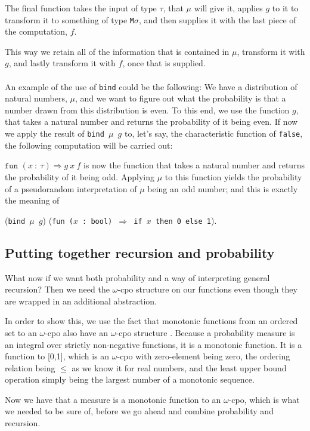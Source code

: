 \documentclass[11pt, leqno, titlepage]{article}
\theoremstyle{definition}
\begin{document}
The final function takes the input of type $\tau$, that $\mu$ will give it,
applies $g$ to it to transform it to something of type \texttt{M}$\sigma$, and then
supplies it with the last piece of the computation, $f$.

This way we retain all of the information that is contained in $\mu$, transform it
with $g$, and lastly transform it with $f$, once that is supplied.\\
\\
An example of the use of \texttt{bind} could be the following: We have a distribution
of natural numbers, $\mu$, and we want to figure out what the probability is that a
number drawn from this distribution is even. To this end, we use the function $g$,
that takes a natural number and returns the probability of it being even. If now we
apply the result of \texttt{bind $\mu$ $g$} to, let's say, the characteristic
function of \texttt{false}, the following computation will be carried out:

$\texttt{fun }(x~:~\tau)\Rightarrow g~x~f$ is now the function that takes a natural
number and returns the probability of it being odd. Applying $\mu$ to this function
yields the probability of a pseudorandom interpretation of $\mu$ being an odd
number; and this is exactly the meaning of

(\texttt{bind $\mu$ $g$}) (\texttt{fun
  ($x$ : bool) $\Rightarrow$ if $x$ then 0 else 1}).

\subsection{Putting together recursion and probability}
\label{sec:prob-rec}
What now if we want both probability and a way of interpreting general recursion?
Then we need the $\omega$-cpo structure on our functions even though they are wrapped
in an additional abstraction.

In order to show this, we use the fact that monotonic functions from an ordered set
to an $\omega$-cpo also have an $\omega$-cpo structure \cite[p.~584]{rml-paper}.
Because a probability measure is an integral over strictly non-negative functions, it
is a monotonic function. It is a function to [0,1], which is an $\omega$-cpo with
zero-element being zero, the ordering relation being $\le$ as we know it for real
numbers, and the least upper bound operation simply being the largest number of a
monotonic sequence.

Now we have that a measure is a monotonic function to an $\omega$-cpo, which is
what we needed to be sure of, before we go ahead and combine probability and
recursion. 
\end{document}
